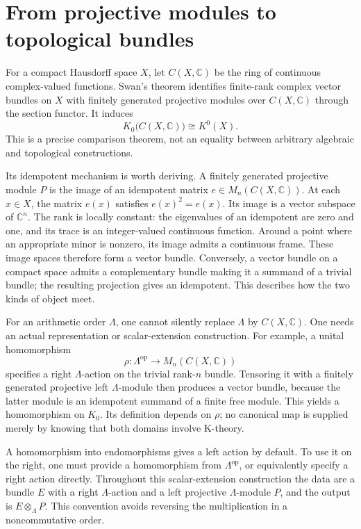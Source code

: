 \section{From projective modules to topological bundles}

For a compact Hausdorff space $X$, let $C(X,\mathbb C)$ be the ring of continuous complex-valued functions. Swan's theorem identifies finite-rank complex vector bundles on $X$ with finitely generated projective modules over $C(X,\mathbb C)$ through the section functor. It induces
\[
K_0\bigl(C(X,\mathbb C)\bigr)\cong K^0(X).
\]
This is a precise comparison theorem, not an equality between arbitrary algebraic and topological constructions.\cite{v2Swan1962}

Its idempotent mechanism is worth deriving. A finitely generated projective module $P$ is the image of an idempotent matrix $e\in M_n(C(X,\mathbb C))$. At each $x\in X$, the matrix $e(x)$ satisfies $e(x)^2=e(x)$. Its image is a vector subspace of $\mathbb C^n$. The rank is locally constant: the eigenvalues of an idempotent are zero and one, and its trace is an integer-valued continuous function. Around a point where an appropriate minor is nonzero, its image admits a continuous frame. These image spaces therefore form a vector bundle. Conversely, a vector bundle on a compact space admits a complementary bundle making it a summand of a trivial bundle; the resulting projection gives an idempotent. This describes how the two kinds of object meet.

For an arithmetic order $\Lambda$, one cannot silently replace $\Lambda$ by $C(X,\mathbb C)$. One needs an actual representation or scalar-extension construction. For example, a unital homomorphism
\[
\rho:\Lambda^{\mathrm{op}}\longrightarrow M_n(C(X,\mathbb C))
\]
specifies a right $\Lambda$-action on the trivial rank-$n$ bundle. Tensoring it with a finitely generated projective left $\Lambda$-module then produces a vector bundle, because the latter module is an idempotent summand of a finite free module. This yields a homomorphism on $K_0$. Its definition depends on $\rho$; no canonical map is supplied merely by knowing that both domains involve K-theory.

\begin{remark}
A homomorphism into endomorphisms gives a left action by default. To use it on the right, one must provide a homomorphism from $\Lambda^{\mathrm{op}}$, or equivalently specify a right action directly. Throughout this scalar-extension construction the data are a bundle $E$ with a right $\Lambda$-action and a left projective $\Lambda$-module $P$, and the output is $E\otimes_\Lambda P$. This convention avoids reversing the multiplication in a noncommutative order.
\end{remark}

